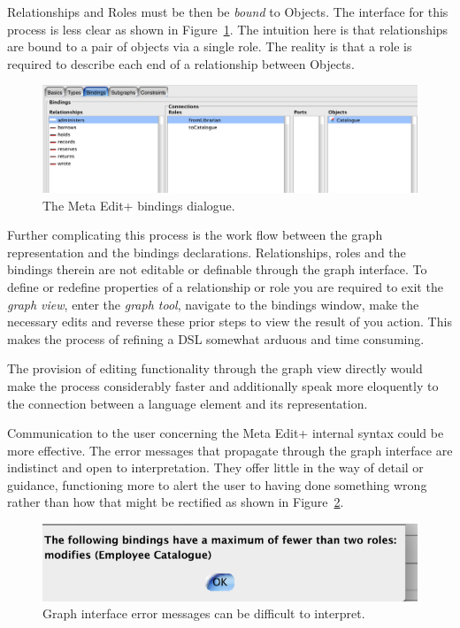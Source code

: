 Relationships and Roles must be then be \emph{bound} to Objects. The interface for this process is less clear as shown in Figure~\ref{fig:bindings}. The intuition here is that relationships are bound to a pair of objects via a single role. The reality is that a role is required to describe each end of a relationship between Objects. \par

  \begin{figure}[h]
    \centering
    \includegraphics[scale=0.4]{images/bindings.png}
    \caption{The Meta Edit+ bindings dialogue.}
    \label{fig:bindings}
  \end{figure}

Further complicating this process is the work flow between the graph representation and the bindings declarations. Relationships, roles and the bindings therein are not editable or definable through the graph interface. To define or redefine properties of a relationship or role you are required to exit the \emph{graph view}, enter the \emph{graph tool}, navigate to the bindings window, make the necessary edits and reverse these prior steps to view the result of you action. This makes the process of refining a DSL somewhat arduous and time consuming.\par The provision of editing functionality through the graph view directly would make the process considerably faster and additionally speak more eloquently to the connection between a language element and its representation.\par
Communication to the user concerning the Meta Edit+ internal syntax could be more effective.
The error messages that propagate through the graph interface are indistinct and open to interpretation. They offer little in the way of detail or guidance, functioning more to alert the user to having done something wrong rather than how that might be rectified as shown in Figure~\ref{fig:error}. \par

  \begin{figure}[h]
    \centering
    \includegraphics[scale=0.5]{images/entity_error.png}
    \caption{Graph interface error messages can be difficult to interpret.}
    \label{fig:error}
  \end{figure}

